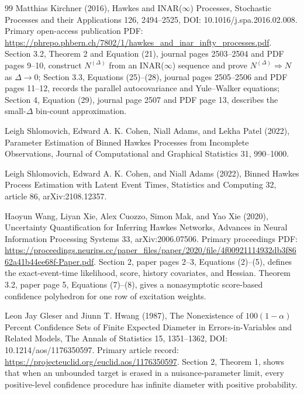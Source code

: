 \documentclass{article}
\begin{document}
\begin{thebibliography}{99}
   Matthias Kirchner (2016), Hawkes and INAR(\(\infty\)) Processes, Stochastic Processes and their Applications 126, 2494--2525, DOI: 10.1016/j.spa.2016.02.008. Primary open-access publication PDF: \url{https://phrepo.phbern.ch/7802/1/hawkes\_and\_inar\_infty\_processes.pdf}. Section 3.2, Theorem 2 and Equation (21), journal pages 2503--2504 and PDF pages 9--10, construct \(N^{(\Delta)}\) from an INAR(\(\infty\)) sequence and prove \(N^{(\Delta)}\Rightarrow N\) as \(\Delta\to0\); Section 3.3, Equations (25)--(28), journal pages 2505--2506 and PDF pages 11--12, records the parallel autocovariance and Yule--Walker equations; Section 4, Equation (29), journal page 2507 and PDF page 13, describes the small-\(\Delta\) bin-count approximation.

   Leigh Shlomovich, Edward A. K. Cohen, Niall Adams, and Lekha Patel (2022), Parameter Estimation of Binned Hawkes Processes from Incomplete Observations, Journal of Computational and Graphical Statistics 31, 990--1000.

   Leigh Shlomovich, Edward A. K. Cohen, and Niall Adams (2022), Binned Hawkes Process Estimation with Latent Event Times, Statistics and Computing 32, article 86, arXiv:2108.12357.

   Haoyun Wang, Liyan Xie, Alex Cuozzo, Simon Mak, and Yao Xie (2020), Uncertainty Quantification for Inferring Hawkes Networks, Advances in Neural Information Processing Systems 33, arXiv:2006.07506. Primary proceedings PDF: \url{https://proceedings.neurips.cc/paper\_files/paper/2020/file/4f00921114932db3f8662a41b44ee68f-Paper.pdf}. Section 2, paper pages 2--3, Equations (2)--(5), defines the exact-event-time likelihood, score, history covariates, and Hessian. Theorem 3.2, paper page 5, Equations (7)--(8), gives a nonasymptotic score-based confidence polyhedron for one row of excitation weights.

   Leon Jay Gleser and Jiunn T. Hwang (1987), The Nonexistence of \(100(1-\alpha)\) Percent Confidence Sets of Finite Expected Diameter in Errors-in-Variables and Related Models, The Annals of Statistics 15, 1351--1362, DOI: 10.1214/aos/1176350597. Primary article record: \url{https://projecteuclid.org/euclid.aos/1176350597}. Section 2, Theorem 1, shows that when an unbounded target is erased in a nuisance-parameter limit, every positive-level confidence procedure has infinite diameter with positive probability.


\end{thebibliography}
\end{document}
